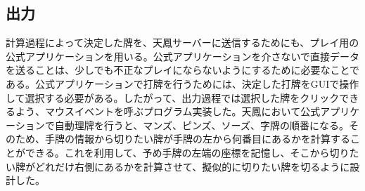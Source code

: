 \subsection{出力}
計算過程によって決定した牌を、天鳳サーバーに送信するためにも、プレイ用の公式アプリケーションを用いる。公式アプリケーションを介さないで直接データを送ることは、少しでも不正なプレイにならないようにするために必要なことである。公式アプリケーションで打牌を行うためには、決定した打牌をGUIで操作して選択する必要がある。したがって、出力過程では選択した牌をクリックできるよう、マウスイベントを呼ぶプログラム実装した。天鳳において公式アプリケーションで自動理牌を行うと、マンズ、ピンズ、ソーズ、字牌の順番になる。そのため、手牌の情報から切りたい牌が手牌の左から何番目にあるかを計算することができる。これを利用して、予め手牌の左端の座標を記憶し、そこから切りたい牌がどれだけ右側にあるかを計算させて、擬似的に切りたい牌を切るように設計した。


